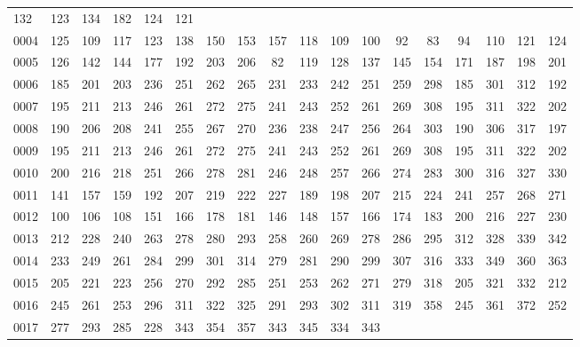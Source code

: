 \begin{table}[htbp]
\begin{center}
{\begin{tabular}{lccccccccccccccccc}
						   132 & 123 & 134 & 182
							       & 124 &
								       121 \\
0004 & 125 & 109 & 117 & 123 & 138 & 150 & 153 & 157 & 118 & 109 & 100
					       & 92 & 83 & 94 & 110 &
								   121 &
								       124 \\
0005 & 126 & 142 & 144 & 177 & 192 & 203 & 206 & 82 & 119 & 128 & 137
					       & 145 & 154 & 171 & 187 &
								   198 &
								       201 \\
0006 & 185 & 201 & 203 & 236 & 251 & 262 & 265 & 231 & 233 & 242 & 251
					       & 259 & 298 & 185 & 301 &
								   312 &
								       192 \\
0007 & 195 & 211 & 213 & 246 & 261 & 272 & 275 & 241 & 243 & 252 & 261
					       & 269 & 308 & 195 & 311 &
								   322 &
								       202 \\
0008 & 190 & 206 & 208 & 241 & 255 & 267 & 270 & 236 & 238 & 247 & 256
					       & 264 & 303 & 190 & 306 &
								   317 &
								       197 \\
0009 & 195 & 211 & 213 & 246 & 261 & 272 & 275 & 241 & 243 & 252 & 261
					       & 269 & 308 & 195 & 311 &
								   322 &
								       202 \\
0010 & 200 & 216 & 218 & 251 & 266 & 278 & 281 & 246 & 248 & 257 & 266
					       & 274 & 283 & 300 & 316 &
								   327 &
								       330 \\
0011 & 141 & 157 & 159 & 192 & 207 & 219 & 222 & 227 & 189 & 198 & 207
					       & 215 & 224 & 241 & 257 &
								   268 &
								       271 \\
0012 & 100 & 106 & 108 & 151 & 166 & 178 & 181 & 146 & 148 & 157 & 166
					       & 174 & 183 & 200 & 216 &
								   227 &
								       230 \\
0013 & 212 & 228 & 240 & 263 & 278 & 280 & 293 & 258 & 260 & 269 & 278
					       & 286 & 295 & 312 & 328 &
								   339 &
								       342 \\
0014 & 233 & 249 & 261 & 284 & 299 & 301 & 314 & 279 & 281 & 290 & 299
					       & 307 & 316 & 333 & 349 &
								   360 &
								       363 \\
0015 & 205 & 221 & 223 & 256 & 270 & 292 & 285 & 251 & 253 & 262 & 271
					       & 279 & 318 & 205 & 321 &
								   332 &
								       212 \\
0016 & 245 & 261 & 253 & 296 & 311 & 322 & 325 & 291 & 293 & 302 & 311
					       & 319 & 358 & 245 & 361 &
								   372 &
								       252 \\
0017 & 277 & 293 & 285 & 228 & 343 & 354 & 357 & 343 & 345 & 334 & 343

\end{tabular}}
\end{center}
\end{table}
